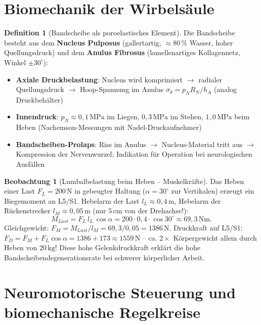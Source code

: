 ﻿\documentclass[a4paper,12pt]{report}
\theoremstyle{definition}
\newtheorem{definition}{Definition}
\newtheorem{beobachtung}{Beobachtung}
\begin{document}
\section{Biomechanik der Wirbelsäule}

\begin{definition}[Bandscheibe als poroelastisches Element]
Die Bandscheibe besteht aus dem \textbf{Nucleus Pulposus} (gallertartig,
$\approx 80\,\%$ Wasser, hoher Quellungsdruck) und dem \textbf{Anulus Fibrosus}
(lamellenartiges Kollagennetz, Winkel $\pm 30^\circ$):
\begin{itemize}
    \item[-] \textbf{Axiale Druckbelastung}: Nucleus wird komprimiert
          $\to$ radialer Quellungsdruck $\to$ Hoop-Spannung im Anulus
          $\sigma_\theta = p_N R_N / h_A$ (analog Druckbehälter)
    \item[-] \textbf{Innendruck}: $p_N \approx 0{,}1\,\mathrm{MPa}$ im Liegen,
          $0{,}3\,\mathrm{MPa}$ im Stehen, $1{,}0\,\mathrm{MPa}$ beim Heben
          (Nachemson-Messungen mit Nadel-Druckaufnehmer)
    \item[-] \textbf{Bandscheiben-Prolaps}: Riss im Anulus $\to$ Nucleus-Material
          tritt aus $\to$ Kompression der Nervenwurzel; Indikation für Operation
          bei neurologischen Ausfällen
\end{itemize}
\end{definition}

\begin{beobachtung}[Lumbalbelastung beim Heben -- Muskelkräfte]
Das Heben einer Last $F_L = 200\,\mathrm{N}$ in gebeugter Haltung
($\alpha = 30^\circ$ zur Vertikalen) erzeugt ein Biegemoment an L5/S1.
Hebelarm der Last $l_L \approx 0{,}4\,\mathrm{m}$, Hebelarm der Rückenstrecker
$l_M \approx 0{,}05\,\mathrm{m}$ (nur $5\,\mathrm{cm}$ von der Drehachse!):
\[
  M_{Last} = F_L\,l_L\,\cos\alpha = 200\cdot0{,}4\cdot\cos30^\circ \approx 69{,}3\,\mathrm{Nm}.
\]
Gleichgewicht: $F_M = M_{Last}/l_M = 69{,}3/0{,}05 = 1386\,\mathrm{N}$.
Druckkraft auf L5/S1: $F_D = F_M + F_L\cos\alpha = 1386 + 173 \approx 1559\,\mathrm{N}$
-- ca. $2\times$ Körpergewicht allein durch Heben von $20\,\mathrm{kg}$!
Diese hohe Gelenkdruckkraft erklärt die hohe Bandscheibendegenerationsrate
bei schwerer körperlicher Arbeit.
\end{beobachtung}

\section{Neuromotorische Steuerung und biomechanische Regelkreise}
\end{document}
